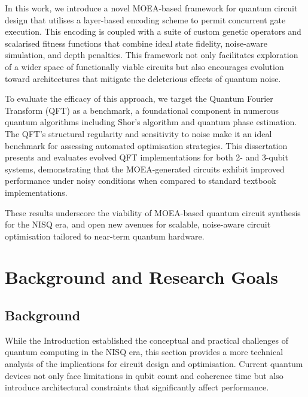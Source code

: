 \documentclass[11pt,a4paper]{article}
\begin{document}
In this work, we introduce a novel MOEA-based framework for quantum circuit design that utilises a layer-based encoding scheme to permit concurrent gate execution. This encoding is coupled with a suite of custom genetic operators and scalarised fitness functions that combine ideal state fidelity, noise-aware simulation, and depth penalties. This framework not only facilitates exploration of a wider space of functionally viable circuits but also encourages evolution toward architectures that mitigate the deleterious effects of quantum noise.\newline

To evaluate the efficacy of this approach, we target the Quantum Fourier Transform (QFT) \cite{Jozsa1997QuantumAA} as a benchmark, a foundational component in numerous quantum algorithms including Shor’s algorithm and quantum phase estimation. The QFT’s structural regularity and sensitivity to noise make it an ideal benchmark for assessing automated optimisation strategies. This dissertation presents and evaluates evolved QFT implementations for both 2- and 3-qubit systems, demonstrating that the MOEA-generated circuits exhibit improved performance under noisy conditions when compared to standard textbook implementations.\newline

These results underscore the viability of MOEA-based quantum circuit synthesis for the NISQ era, and open new avenues for scalable, noise-aware circuit optimisation tailored to near-term quantum hardware.


%
%
\section{Background and Research Goals}
\subsection{Background}
While the Introduction established the conceptual and practical challenges of quantum computing in the NISQ era, this section provides a more technical analysis of the implications for circuit design and optimisation. Current quantum devices not only face limitations in qubit count and coherence time but also introduce architectural constraints that significantly affect performance.\newline
\end{document}
